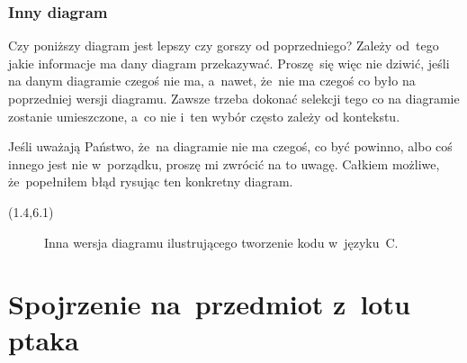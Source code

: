 \documentclass[10pt,t]{beamer}
\begin{document}
\begin{frame}
  \frametitle{Inny diagram}


  Czy poniższy diagram jest lepszy czy gorszy od poprzedniego? Zależy
  od~tego jakie informacje ma dany diagram przekazywać. Proszę~się więc nie
  dziwić, jeśli na danym diagramie czegoś nie ma, a~nawet, że~nie ma czegoś
  co było na poprzedniej wersji diagramu. Zawsze trzeba dokonać selekcji
  tego co na diagramie zostanie umieszczone, a~co nie i~ten wybór często
  zależy od kontekstu.

  Jeśli uważają Państwo, że~na diagramie nie ma czegoś, co być powinno,
  albo coś innego jest nie w~porządku, \alert{proszę} mi zwrócić na to
  uwagę. Całkiem możliwe, że~popełniłem błąd rysując ten konkretny diagram.





  \begin{textblock}{10.9}(1.4,6.1)

    \begin{figure}

      \label{fig:Also-creating-code-in-C}



      \caption{Inna wersja diagramu ilustrującego tworzenie kodu
        w~języku~C.}


    \end{figure}

  \end{textblock}

\end{frame}










\section{Spojrzenie na~przedmiot z~lotu ptaka}
\end{document}
